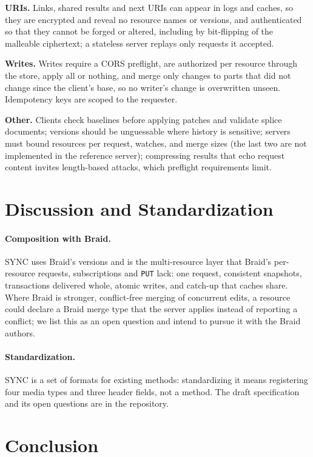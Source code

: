 \documentclass[11pt,a4paper]{article}
\begin{document}
\textbf{URIs.} Links, shared results and next URIs can appear in logs and caches, so they are encrypted and reveal no resource names or versions, and authenticated so that they cannot be forged or altered, including by bit-flipping of the malleable ciphertext; a stateless server replays only requests it accepted.

\textbf{Writes.} Writes require a CORS preflight, are authorized per resource through the store, apply all or nothing, and merge only changes to parts that did not change since the client's base, so no writer's change is overwritten unseen. Idempotency keys are scoped to the requester.

\textbf{Other.} Clients check baselines before applying patches and validate splice documents; versions should be unguessable where history is sensitive; servers must bound resources per request, watches, and merge sizes (the last two are not implemented in the reference server); compressing results that echo request content invites length-based attacks, which preflight requirements limit.

\section{Discussion and Standardization}
\label{sec:discussion}

\paragraph{Composition with Braid.}
SYNC uses Braid's versions and is the multi-resource layer that Braid's per-resource requests, subscriptions and \texttt{PUT} lack: one request, consistent snapshots, transactions delivered whole, atomic writes, and catch-up that caches share. Where Braid is stronger, conflict-free merging of concurrent edits, a resource could declare a Braid merge type that the server applies instead of reporting a conflict; we list this as an open question and intend to pursue it with the Braid authors.

\paragraph{Standardization.}
SYNC is a set of formats for existing methods: standardizing it means registering four media types and three header fields, not a method. The draft specification and its open questions are in the repository.

\section{Conclusion}
\end{document}
